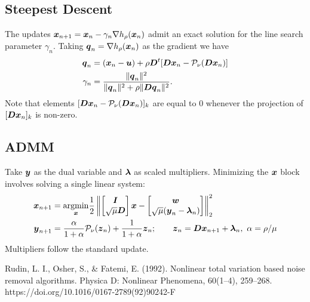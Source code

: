 \documentclass[11pt]{article}
\begin{document}
\subsection*{Steepest Descent}

The updates $\boldsymbol{x}_{n+1} = \boldsymbol{x}_{n} - \gamma_{n} \nabla h_{\rho}(\boldsymbol{x}_{n})$ admit an exact solution for the line search parameter $\gamma_{n}$.
Taking $\boldsymbol{q}_{n} = \nabla h_{\rho}(\boldsymbol{x}_{n})$ as the gradient we have
\begin{align*}
  \boldsymbol{q}_{n}
  &= (\boldsymbol{x}_{n} - \boldsymbol{u}) + \rho \boldsymbol{D}^{t} [\boldsymbol{D} \boldsymbol{x}_{n} - \mathcal{P}_{\nu}(\boldsymbol{D} \boldsymbol{x}_{n})] \\
  \gamma_{n}
  &=
  \frac{\|\boldsymbol{q}_{n}\|^{2}}{\|\boldsymbol{q}_{n}\|^{2} + \rho \|\boldsymbol{D} \boldsymbol{q}_{n}\|^{2}}.
\end{align*}
Note that elements $[\boldsymbol{D} \boldsymbol{x}_{n} - \mathcal{P}_{\nu}(\boldsymbol{D}\boldsymbol{x}_{n})]_{k}$ are equal to $0$ whenever the projection of $[\boldsymbol{D} \boldsymbol{x}_{n}]_{k}$ is non-zero.

\subsection*{ADMM}

Take $\boldsymbol{y}$ as the dual variable and $\boldsymbol{\lambda}$ as scaled multipliers.
Minimizing the $\boldsymbol{x}$ block involves solving a single linear system:
\begin{align*}
    \boldsymbol{x}_{n+1}
    &=
    \underset{\boldsymbol{x}}{\mathop{\rm argmin}\nolimits} \frac{1}{2} \left\|
        \begin{bmatrix}
        \boldsymbol{I} \\
        \sqrt{\mu} \boldsymbol{D}
        \end{bmatrix} \boldsymbol{x}
        -
        \begin{bmatrix}
        \boldsymbol{w} \\
        \sqrt{\mu} (\boldsymbol{y}_{n} - \boldsymbol{\lambda}_{n})
        \end{bmatrix}
    \right\|_{2}^{2} \\
    \boldsymbol{y}_{n+1}
    &= \frac{\alpha}{1+\alpha} \mathcal{P}_{\nu}(\boldsymbol{z}_{n}) + \frac{1}{1+\alpha} \boldsymbol{z}_{n};
    \qquad \boldsymbol{z}_{n} = \boldsymbol{D} \boldsymbol{x}_{n+1} + \boldsymbol{\lambda}_{n},~\alpha = \rho / \mu
    \end{align*}
Multipliers follow the standard update.

\begin{thebibliography}{99}
     Rudin, L. I., Osher, S., \& Fatemi, E. (1992). Nonlinear total variation based noise removal algorithms. Physica D: Nonlinear Phenomena, 60(1–4), 259–268. https://doi.org/10.1016/0167-2789(92)90242-F
\end{thebibliography}
\end{document}
